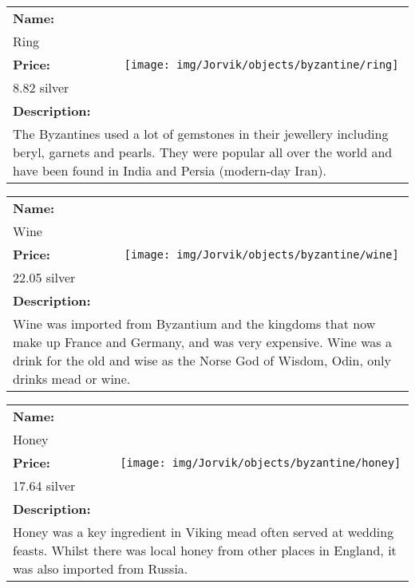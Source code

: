 \begin{table}[ht!]
	\centering
	\begin{tabular}{ p{3cm} c }\toprule
		\textbf{Name:} & \multirow{5}{*}{\texttt{[image: img/Jorvik/objects/byzantine/ring]}}\\
		Ring & \\ 
		\textbf{Price:} & \\
		8.82 silver & \\ 
		\textbf{Description:} & \\
		\multicolumn{2}{p{12cm}}{The Byzantines used a lot of gemstones in their jewellery including beryl, garnets and pearls. They were popular all over the world and have been found in India and Persia (modern-day Iran).}\\
		\bottomrule
	\end{tabular}
\end{table}

\begin{table}[ht!]
	\centering
	\begin{tabular}{ p{3cm} c }\toprule
		\textbf{Name:} & \multirow{5}{*}{\texttt{[image: img/Jorvik/objects/byzantine/wine]}}\\
		Wine & \\ 
		\textbf{Price:} & \\
		22.05 silver & \\ 
		\textbf{Description:} & \\
		\multicolumn{2}{p{12cm}}{Wine was imported from Byzantium and the kingdoms that now make up France and Germany, and was very expensive. Wine was a drink for the old and wise as the Norse God of Wisdom, Odin, only drinks mead or wine.}\\
		\bottomrule
	\end{tabular}
\end{table}

\begin{table}[ht!]
	\centering
	\begin{tabular}{ p{3cm} c }\toprule
		\textbf{Name:} & \multirow{5}{*}{\texttt{[image: img/Jorvik/objects/byzantine/honey]}}\\
		Honey & \\ 
		\textbf{Price:} & \\
		17.64 silver & \\ 
		\textbf{Description:} & \\
		\multicolumn{2}{p{12cm}}{Honey was a key ingredient in Viking mead often served at wedding feasts. Whilst there was local honey from other places in England, it was also imported from Russia.}\\
		\bottomrule
	\end{tabular}
\end{table}

